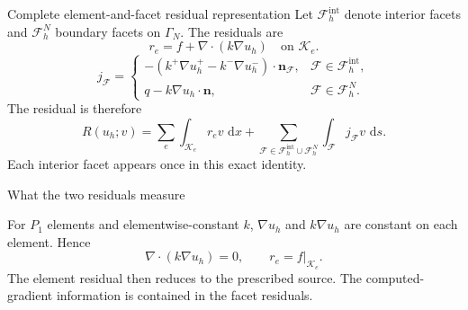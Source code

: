 \documentclass[11pt,aspectratio=169]{beamer}
\newcommand{\dd}{\,\mathrm{d}}
\newcommand{\GamN}{\Gamma_N}
\newcommand{\Fh}{\mathcal F_h}
\newcommand{\grad}{\nabla}
\newcommand{\divg}{\nabla\!\cdot}
\newcommand{\bn}{\bm n}
\begin{document}
\begin{frame}{Complete element-and-facet residual representation}
Let $\Fh^{\mathrm{int}}$ denote interior facets and $\Fh^N$ boundary facets
on $\GamN$. The residuals are
\[
  r_e=f+\divg(k\grad u_h)\quad\text{on }\mathcal K_e.
\]
\[
j_{\mathcal F}=\begin{cases}
 -(k^+\grad u_h^+-k^-\grad u_h^-)\cdot\bn_{\mathcal F},
   &\mathcal F\in\Fh^{\mathrm{int}},\\[3pt]
 q-k\grad u_h\cdot\bn, &\mathcal F\in\Fh^N.
\end{cases}
\]
The residual is therefore
\[
\boxed{
R(u_h;v)=
\sum_e\int_{\mathcal K_e}r_ev\,\dd x
+\sum_{\mathcal F\in\Fh^{\mathrm{int}}\cup\Fh^N}
\int_{\mathcal F}j_{\mathcal F}v\,\dd s.}
\]
Each interior facet appears once in this exact identity.
\end{frame}

\begin{frame}{What the two residuals measure}
\begin{center}
\end{center}

For $P_1$ elements and elementwise-constant $k$, $\grad u_h$ and
$k\grad u_h$ are constant on each element. Hence
\[
  \divg(k\grad u_h)=0,
  \qquad r_e=f|_{\mathcal K_e}.
\]
The element residual then reduces to the prescribed source. The
computed-gradient information is contained in the facet residuals.
\end{frame}
\end{document}
